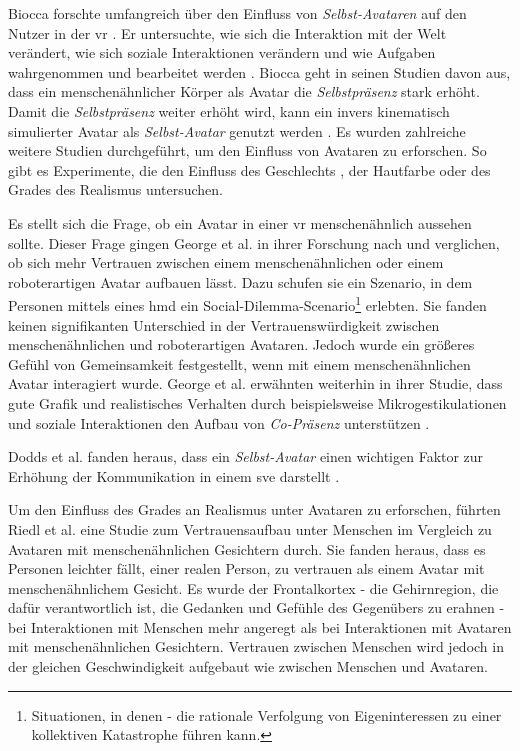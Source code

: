 \documentclass[a4paper,11pt]{article}%
\renewcommand{\\}{\vspace*{0.5\baselineskip} \newline}
\begin{document}
Biocca forschte umfangreich über den Einfluss von \textit{Selbst-Avataren} auf den Nutzer in der \ac{vr} \citep[421-427]{construal2014connected}.
\newline Er untersuchte, wie sich die Interaktion mit der Welt verändert, wie sich soziale Interaktionen verändern und wie Aufgaben wahrgenommen und bearbeitet werden \citep{benford1995user} \citep{bowers1996talk}.
Biocca geht in seinen Studien davon aus, dass ein menschenähnlicher Körper als Avatar die \textit{Selbstpräsenz} stark erhöht. Damit die \textit{Selbstpräsenz} weiter erhöht wird, kann ein invers kinematisch simulierter Avatar als \textit{Selbst-Avatar} genutzt werden \citep[421-427]{construal2014connected}.
\label{AvatarTrust}
Es wurden zahlreiche weitere Studien durchgeführt, um den Einfluss von Avataren zu erforschen. So gibt es Experimente, die den Einfluss des Geschlechts \citep{slater2010first}, der Hautfarbe \citep{peck2013putting} oder des Grades des Realismus \citep{roth2016avatar} untersuchen.

Es stellt sich die Frage, ob ein Avatar in einer \ac{vr} menschenähnlich aussehen sollte. Dieser Frage gingen George et al. \citep{george2018trusting} in ihrer Forschung nach und verglichen, ob sich mehr Vertrauen zwischen einem menschenähnlichen oder einem roboterartigen Avatar aufbauen lässt.
Dazu schufen sie ein Szenario, in dem Personen mittels eines \ac{hmd} ein Social-Dilemma-Scenario\footnote{Situationen, in denen - die rationale Verfolgung von Eigeninteressen zu einer kollektiven Katastrophe führen kann.} erlebten. Sie fanden keinen signifikanten Unterschied in der Vertrauenswürdigkeit zwischen menschenähnlichen und roboterartigen Avataren. Jedoch wurde ein größeres Gefühl von Gemeinsamkeit festgestellt, wenn mit einem menschenähnlichen Avatar interagiert wurde.
George et al. erwähnten weiterhin in ihrer Studie, dass gute Grafik und realistisches Verhalten durch beispielsweise Mikrogestikulationen und soziale Interaktionen den Aufbau von \textit{Co-Präsenz} unterstützen \citep{george2018trusting}.

Dodds et al. fanden heraus, dass ein \textit{Selbst-Avatar} einen wichtigen Faktor zur Erhöhung der Kommunikation in einem \ac{sve} darstellt \citep[1-11]{dodds2011talk}.

Um den Einfluss des Grades an Realismus unter Avataren zu erforschen, führten Riedl et al. \citep{riedl2014trusting} eine Studie zum Vertrauensaufbau unter Menschen im Vergleich zu Avataren mit menschenähnlichen Gesichtern durch. Sie fanden heraus, dass es Personen leichter fällt, einer realen Person, zu vertrauen als einem Avatar mit menschenähnlichem Gesicht. Es wurde der Frontalkortex - die Gehirnregion, die dafür verantwortlich ist, die Gedanken und Gefühle des Gegenübers zu erahnen - bei Interaktionen mit Menschen mehr angeregt als bei Interaktionen mit Avataren mit menschenähnlichen Gesichtern.
Vertrauen zwischen Menschen wird jedoch in der gleichen Geschwindigkeit aufgebaut wie zwischen Menschen und Avataren.
\end{document}
